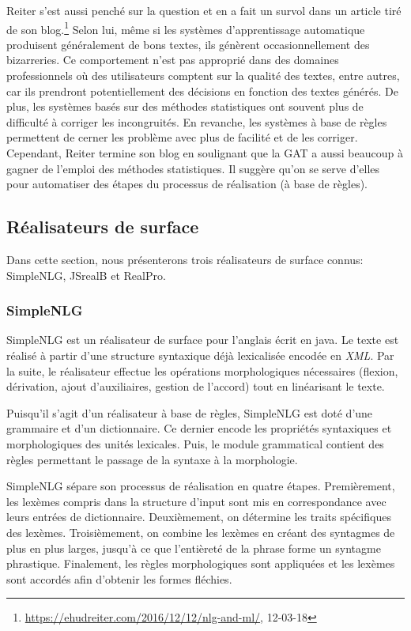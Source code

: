 Reiter s'est aussi penché sur la question et en a fait un survol dans un article tiré de son blog.\footnote{\url{https://ehudreiter.com/2016/12/12/nlg-and-ml/}, 12-03-18} Selon lui, même si les systèmes d'apprentissage automatique produisent généralement de bons textes, ils génèrent occasionnellement des bizarreries. Ce comportement n'est pas approprié dans des domaines professionnels où des utilisateurs comptent sur la qualité des textes, entre autres, car ils prendront potentiellement des décisions en fonction des textes générés. De plus, les systèmes basés sur des méthodes statistiques ont souvent plus de difficulté à corriger les incongruités. En revanche, les systèmes à base de règles permettent de cerner les problème avec plus de facilité et de les corriger. Cependant, Reiter termine son blog en soulignant que la \ac{GAT} a aussi beaucoup à gagner de l'emploi des méthodes statistiques. Il suggère qu'on se serve d'elles pour automatiser des étapes du processus de réalisation (à base de règles).


\subsection{Réalisateurs de surface}

Dans cette section, nous présenterons trois réalisateurs de surface connus: SimpleNLG, JSrealB et RealPro.

\subsubsection{SimpleNLG}
SimpleNLG \citep{GattSimpleNLGRealisationEngine2009} est un réalisateur de surface pour l'anglais écrit en java. Le texte est réalisé à partir d'une structure syntaxique déjà lexicalisée encodée en \emph{XML}. Par la suite, le réalisateur effectue les opérations morphologiques nécessaires (flexion, dérivation, ajout d'auxiliaires, gestion de l'accord) tout en linéarisant le texte.

Puisqu'il s'agit d'un réalisateur à base de règles, SimpleNLG est doté d'une grammaire et d'un dictionnaire. Ce dernier encode les propriétés syntaxiques et morphologiques des unités lexicales. Puis, le module grammatical contient des règles permettant le passage de la syntaxe à la morphologie.

SimpleNLG sépare son processus de réalisation en quatre étapes. Premièrement, les lexèmes compris dans la structure d'input sont mis en correspondance avec leurs entrées de dictionnaire. Deuxièmement, on détermine les traits spécifiques des lexèmes. Troisièmement, on combine les lexèmes en créant des syntagmes de plus en plus larges, jusqu'à ce que l'entièreté de la phrase forme un syntagme phrastique. Finalement, les règles morphologiques sont appliquées et les lexèmes sont accordés afin d'obtenir les formes fléchies.

